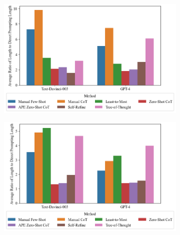 \documentclass[11pt]{article}
\begin{document}
\begin{figure}
  \caption{Average Length vs. Direct Prompting Length}
  \begin{subfigure}[h]{0.4925\textwidth}
      \centering
      \includegraphics[width=0.95\hsize]{../Output/gsm8k_length_vs_direct_prompting_means.png} 
  \end{subfigure}
  \begin{subfigure}[h]{0.4925\textwidth}
      \centering
      \includegraphics[width=0.95\hsize]{../Output/cw_length_vs_direct_prompting_means.png}
  \end{subfigure}
  \hfill
  \label{fig:len_v_dp}
\end{figure}
\end{document}
